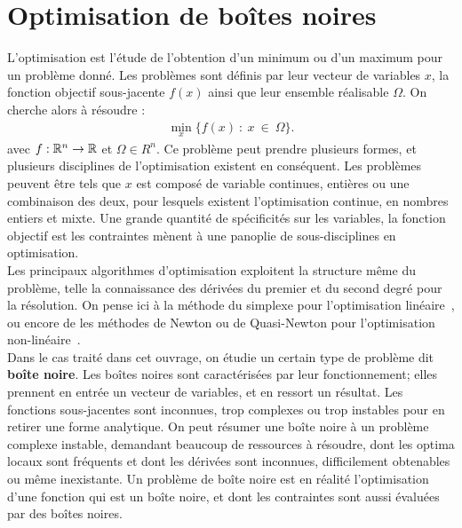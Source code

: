 \label{sec:Introduction}  %
\section{Optimisation de boîtes noires}
L'optimisation est l'étude de l'obtention d'un minimum ou d'un maximum pour un problème donné. Les problèmes sont définis par leur vecteur de variables $x$, la fonction objectif sous-jacente $f(x)$ ainsi que leur ensemble réalisable $\Omega$. On cherche alors à résoudre :
\begin{gather}
\underset{x}{\min}\{f(x)\ :\ x\ \in\ \Omega\}.
\end{gather}
avec $f : \mathbb{R} ^n \rightarrow \mathbb{R}$ et $\Omega \in R^n$. Ce problème peut prendre plusieurs formes, et plusieurs disciplines de l'optimisation existent en conséquent. Les problèmes peuvent être tels que $x$ est composé de variable continues, entières ou une combinaison des deux, pour lesquels existent l'optimisation continue, en nombres entiers et mixte. Une grande quantité de spécificités sur les variables, la fonction objectif est les contraintes mènent à une panoplie de sous-disciplines en optimisation.\\
Les principaux algorithmes d'optimisation exploitent la structure même du problème, telle la connaissance des dérivées du premier et du second degré pour la résolution. On pense ici à la méthode du simplexe pour l'optimisation linéaire~\cite{NaSo96a}, ou encore de les méthodes de Newton ou de Quasi-Newton pour l'optimisation non-linéaire~\cite{NoWr99a}.\\
Dans le cas traité dans cet ouvrage, on étudie un certain type de problème dit \textbf{boîte noire}. Les boîtes noires sont caractérisées par leur fonctionnement; elles prennent en entrée un vecteur de variables, et en ressort un résultat. Les fonctions sous-jacentes sont inconnues, trop complexes ou trop instables pour en retirer une forme analytique. On peut résumer une boîte noire à un problème complexe instable, demandant beaucoup de ressources à résoudre, dont les optima locaux sont fréquents et dont les dérivées sont inconnues, difficilement obtenables ou même inexistante. Un problème de boîte noire est en réalité l'optimisation d'une fonction qui est un boîte noire, et dont les contraintes sont aussi évaluées par des boîtes noires.\\
